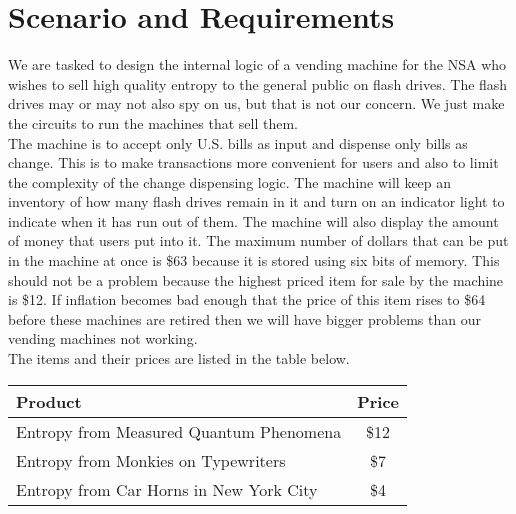 \section{Scenario and Requirements} 

We are tasked to design the internal logic of a vending machine for the NSA who wishes to sell high quality entropy to the general public on flash drives. The flash drives may or may not also spy on us, but that is not our concern. We just make the circuits to run the machines that sell them. \\

The machine is to accept only U.S. bills as input and dispense only bills as change. This is to make transactions more convenient for users and also to limit the complexity of the change dispensing logic. The machine will keep an inventory of how many flash drives remain in it and turn on an indicator light to indicate when it has run out of them. The machine will also display the amount of money that users put into it. The maximum number of dollars that can be put in the machine at once is \$63 because it is stored using six bits of memory. This should not be a problem because the highest priced item for sale by the machine is \$12. If inflation becomes bad enough that the price of this item rises to \$64 before these machines are retired then we will have bigger problems than our vending machines not working. \\

The items and their prices are listed in the table below. 

\begin{tabular}{|l|c|}
\hline 
\textbf{Product} & \textbf{Price} \\ 
\hline 
Entropy from Measured Quantum Phenomena  & \$12 \\ 
\hline 
Entropy from Monkies on Typewriters & \$7 \\ 
\hline 
Entropy from Car Horns in New York City & \$4 \\ 
\hline 
\end{tabular} 